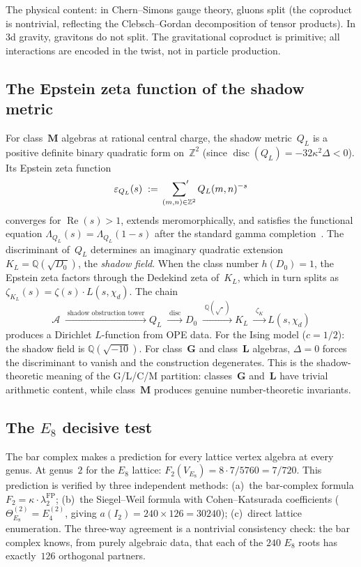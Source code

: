 \documentclass[11pt,reqno]{amsart}
\theoremstyle{definition}
\theoremstyle{remark}
\newcommand{\cA}{\mathcal{A}}
\numberwithin{equation}{section}
\begin{document}
The physical content: in Chern--Simons gauge theory, gluons
split (the coproduct is nontrivial, reflecting the
Clebsch--Gordan decomposition of tensor products). In
$3$d gravity, gravitons do not split. The gravitational
coproduct is primitive; all interactions are encoded in
the twist, not in particle production.

\subsection{The Epstein zeta function of the shadow metric}

For class~$\mathbf{M}$ algebras at rational central charge,
the shadow metric~$Q_L$ is a positive definite binary quadratic
form on~$\mathbb{Z}^2$ (since
$\operatorname{disc}(Q_L) = -32\kappa^2\Delta < 0$). Its
Epstein zeta function
\[
 \varepsilon_{Q_L}(s)
 \;:=\;
 \sideset{}{'}\sum_{(m,n) \in \mathbb{Z}^2}
 Q_L(m,n)^{-s}
\]
converges for $\operatorname{Re}(s) > 1$, extends
meromorphically, and satisfies the functional equation
$\Lambda_{Q_L}(s) = \Lambda_{Q_L}(1 - s)$ after the standard
gamma completion~\cite{Epstein1903, Terras73}. The
discriminant of~$Q_L$ determines an imaginary quadratic
extension $K_L = \mathbb{Q}(\sqrt{D_0})$, the \emph{shadow
field}. When the class number $h(D_0) = 1$, the Epstein
zeta factors through the Dedekind zeta of~$K_L$, which in
turn splits as $\zeta_{K_L}(s) = \zeta(s) \cdot L(s, \chi_d)$.
The chain
\begin{equation}\label{eq:intro-shadow-field-chain}
 \cA
 \;\xrightarrow{\;\text{shadow obstruction tower}\;}
 Q_L
 \;\xrightarrow{\;\operatorname{disc}\;}
 D_0
 \;\xrightarrow{\;\mathbb{Q}(\sqrt{\cdot})\;}
 K_L
 \;\xrightarrow{\;\zeta_K\;}
 L(s, \chi_d)
\end{equation}
produces a Dirichlet $L$-function from OPE data. For the
Ising model ($c = 1/2$): the shadow field is
$\mathbb{Q}(\sqrt{-10})$. For class~$\mathbf{G}$ and
class~$\mathbf{L}$ algebras, $\Delta = 0$ forces the
discriminant to vanish and the construction degenerates.
This is the shadow-theoretic meaning of the G/L/C/M
partition: classes~$\mathbf{G}$ and~$\mathbf{L}$ have
trivial arithmetic content, while class~$\mathbf{M}$ produces
genuine number-theoretic invariants.

\subsection{The $E_8$ decisive test}

The bar complex makes a prediction for every lattice vertex
algebra at every genus. At genus~$2$ for the $E_8$ lattice:
$F_2(V_{E_8}) = 8 \cdot 7/5760 = 7/720$. This prediction
is verified by three independent methods:
(a)~the bar-complex formula $F_2 = \kappa \cdot \lambda_2^{\mathrm{FP}}$;
(b)~the Siegel--Weil formula with Cohen--Katsurada coefficients
($\Theta_{E_8}^{(2)} = E_4^{(2)}$, giving
$a(I_2) = 240 \times 126 = 30240$);
(c)~direct lattice enumeration.
The three-way agreement is a nontrivial consistency check:
the bar complex knows, from purely algebraic data, that each
of the $240$ $E_8$ roots has exactly~$126$ orthogonal partners.
\end{document}
